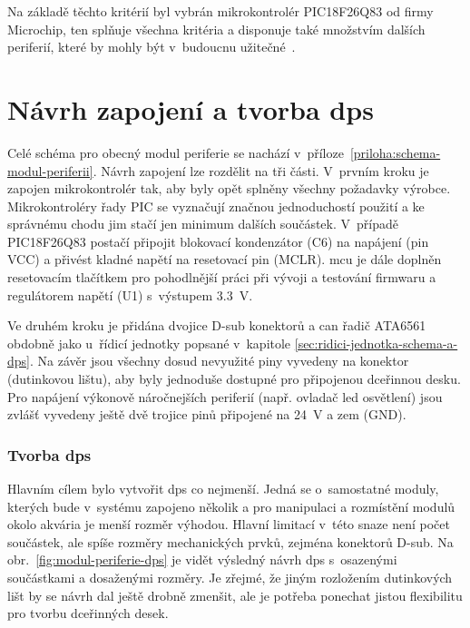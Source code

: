         Na základě těchto kritérií byl vybrán mikrokontrolér PIC18F26Q83 od firmy Microchip, ten splňuje všechna kritéria a disponuje také množstvím dalších periferií, které by mohly být v~budoucnu užitečné~\cite{PIC18F26Q83}.

    \section{Návrh zapojení a tvorba \acs{dps}}
        Celé schéma pro obecný modul periferie se nachází v~příloze~\ref{priloha:schema-modul-periferii}. Návrh zapojení lze rozdělit na tři části. V~prvním kroku je zapojen mikrokontrolér tak, aby byly opět splněny všechny požadavky výrobce. Mikrokontroléry řady PIC se vyznačují značnou jednoduchostí použití a ke správnému chodu jim stačí jen minimum dalších součástek. V~případě PIC18F26Q83 postačí připojit blokovací kondenzátor (C6) na napájení (pin VCC) a přivést kladné napětí na resetovací pin (MCLR). \acs{mcu} je dále doplněn resetovacím tlačítkem pro pohodlnější práci při vývoji a testování firmwaru a regulátorem napětí (U1) s~výstupem \qty{3.3}{V}. 

        Ve druhém kroku je přidána dvojice D-sub konektorů a \acs{can} řadič ATA6561 obdobně jako u~řídicí jednotky popsané v~kapitole \ref{sec:ridici-jednotka-schema-a-dps}. Na závěr jsou všechny dosud nevyužité piny vyvedeny na konektor (dutinkovou lištu), aby byly jednoduše dostupné pro připojenou dceřinnou desku. Pro napájení výkonově náročnejších periferií (např. ovladač \acs{led} osvětlení) jsou zvlášť vyvedeny ještě dvě trojice pinů připojené na \qty{24}{V} a zem (GND).

        \subsubsection{Tvorba \acs{dps}}
        Hlavním cílem bylo vytvořit \acs{dps} co nejmenší. Jedná se o~samostatné moduly, kterých bude v~systému zapojeno několik a pro manipulaci a rozmístění modulů okolo akvária je menší rozměr výhodou. Hlavní limitací v~této snaze není počet součástek, ale spíše rozměry mechanických prvků, zejména konektorů D-sub. Na obr.~\ref{fig:modul-periferie-dps} je vidět výsledný návrh \acs{dps} s~osazenými součástkami a dosaženými rozměry. Je zřejmé, že jiným rozložením dutinkových lišt by se návrh dal ještě drobně zmenšit, ale je potřeba ponechat jistou flexibilitu pro tvorbu dceřinných desek.

